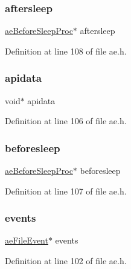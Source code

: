 \subsubsection{\texorpdfstring{aftersleep}{aftersleep}}
{\footnotesize\ttfamily \hyperlink{ae_8h_a9b418f26d4997ba2d303dd247ae45718}{ae\+Before\+Sleep\+Proc}$\ast$ aftersleep}



Definition at line 108 of file ae.\+h.

\mbox{\label{structae_event_loop_a6c38ead7bed5299f416045c1940ee5b1}} 
\subsubsection{\texorpdfstring{apidata}{apidata}}
{\footnotesize\ttfamily void$\ast$ apidata}



Definition at line 106 of file ae.\+h.

\mbox{\label{structae_event_loop_a237a195466baef2c9cc26255774fd7cb}} 
\subsubsection{\texorpdfstring{beforesleep}{beforesleep}}
{\footnotesize\ttfamily \hyperlink{ae_8h_a9b418f26d4997ba2d303dd247ae45718}{ae\+Before\+Sleep\+Proc}$\ast$ beforesleep}



Definition at line 107 of file ae.\+h.

\mbox{\label{structae_event_loop_af7bb19dd3fc37f35b9b655455679ce56}} 
\subsubsection{\texorpdfstring{events}{events}}
{\footnotesize\ttfamily \hyperlink{structae_file_event}{ae\+File\+Event}$\ast$ events}



Definition at line 102 of file ae.\+h.

